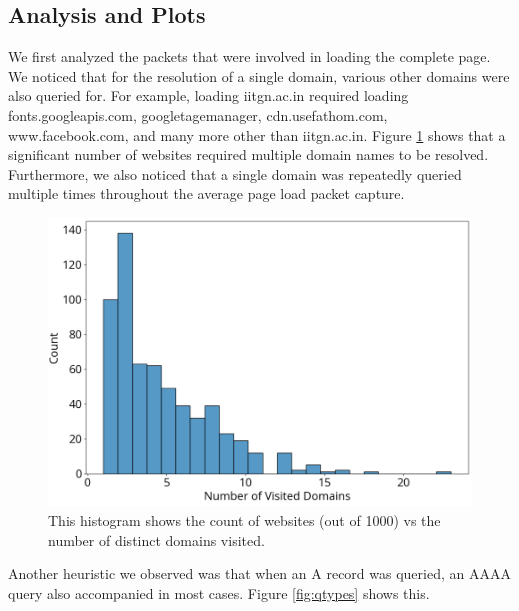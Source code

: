 \documentclass[conference]{IEEEtran}
\begin{document}
\subsection{Analysis and Plots}
We first analyzed the packets that were involved in loading the complete page. We noticed that for the resolution of a single domain, various other domains were also queried for. For example, loading iitgn.ac.in required loading fonts.googleapis.com, googletagemanager, cdn.usefathom.com, www.facebook.com, and many more other than iitgn.ac.in. Figure \ref{fig:n_visited-domains} shows that a significant number of websites required multiple domain names to be resolved. Furthermore, we also noticed that a single domain was repeatedly queried multiple times throughout the average page load packet capture.

\begin{figure}[htbp]
    \centering
    \includegraphics[width=1\linewidth]{images/n_visited-domains.png}
    \caption{This histogram shows the count of websites (out of 1000) vs the number of distinct domains visited.}
    \label{fig:n_visited-domains}
\end{figure}

Another heuristic we observed was that when an A record was queried, an AAAA query also accompanied in most cases. Figure \ref{fig:qtypes} shows this. 
\end{document}
